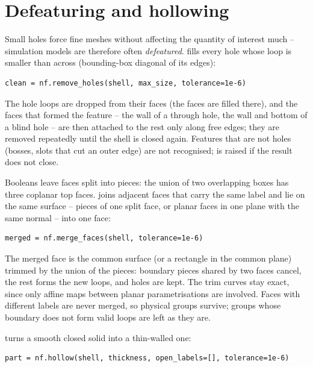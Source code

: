 \section{Defeaturing and hollowing}\label{sec:defeature}

Small holes force fine meshes without affecting the quantity of interest much -- simulation
models are therefore often \emph{defeatured}.  fills every hole whose loop
is smaller than  across (bounding-box diagonal of its edges):

\begin{lstlisting}
clean = nf.remove_holes(shell, max_size, tolerance=1e-6)
\end{lstlisting}

The hole loops are dropped from their faces (the faces are filled there), and the faces that
formed the feature -- the wall of a through hole, the wall and bottom of a blind hole -- are
then attached to the rest only along free edges; they are removed repeatedly until the shell
is closed again. Features that are not holes (bosses, slots that cut an outer edge) are not
recognised;  is raised if the result does not close.

Booleans leave faces split into pieces: the union of two overlapping boxes has three coplanar
top faces.  joins adjacent faces that carry the same label and lie on the
same surface -- pieces of one split face, or planar faces in one plane with the same normal --
into one face:

\begin{lstlisting}
merged = nf.merge_faces(shell, tolerance=1e-6)
\end{lstlisting}

The merged face is the common surface (or a rectangle in the common plane) trimmed by the union
of the pieces: boundary pieces shared by two faces cancel, the rest forms the new loops, and
holes are kept. The trim curves stay exact, since only affine maps between planar
parametrisations are involved. Faces with different labels are never merged, so physical
groups survive; groups whose boundary does not form valid loops are left as they are.

 turns a smooth closed solid into a thin-walled one:

\begin{lstlisting}
part = nf.hollow(shell, thickness, open_labels=[], tolerance=1e-6)
\end{lstlisting}

